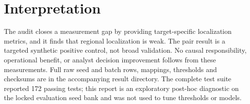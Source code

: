 \documentclass[10pt]{article}
\begin{document}
\section*{Interpretation}
The audit closes a measurement gap by providing target-specific localization metrics, and it finds that regional localization is weak. The pair result is a targeted synthetic positive control, not broad validation. No causal responsibility, operational benefit, or analyst decision improvement follows from these measurements. Full raw seed and batch rows, mappings, thresholds and checksums are in the accompanying result directory. The complete test suite reported 172 passing tests; this report is an exploratory post-hoc diagnostic on the locked evaluation seed bank and was not used to tune thresholds or models.
\end{document}
